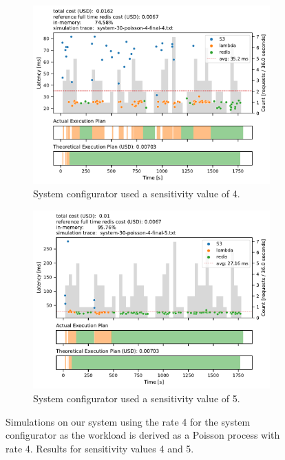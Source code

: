 \begin{figure}[pht!]
    \centering
    \begin{subfigure}{.8\textwidth}
        \includegraphics[width=\linewidth]{figures/system-30-poisson-4-final-4.pdf}
        \caption{System configurator used a sensitivity value of 4.}
        \label{fig:poisson_4_4}
    \end{subfigure}
    \begin{subfigure}{.8\textwidth}
        \includegraphics[width=\linewidth]{figures/system-30-poisson-4-final-5.pdf}
        \caption{System configurator used a sensitivity value of 5.}
        \label{fig:poisson_4_5}
    \end{subfigure}
    \caption{Simulations on our system using the rate 4 for the system configurator as the workload is derived as a Poisson process with rate 4. Results for sensitivity values 4 and 5.}
    \label{fig:poisson_4_45}
\end{figure}

